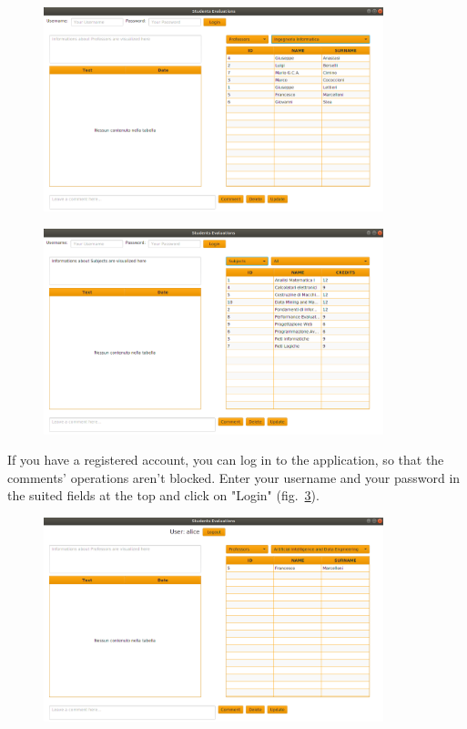 \documentclass[a4paper, oneside]{article}
\begin{document}
\begin{figure}[h]
\centering
\includegraphics[width=0.88\textwidth]{images/screens/screen1}
\label{fig:screen1}
\end{figure}
\clearpage
\begin{figure}[h]
\centering
\includegraphics[width=0.88\textwidth]{images/screens/screen2}
\label{fig:screen2}
\end{figure}

If you have a registered account, you can log in to the application, so that the comments' operations aren't blocked. Enter your username and your password in the suited fields at the top and click on "Login" (fig.~\ref{fig:screenLogin}).
\begin{figure}[h]
\centering
\includegraphics[width=0.88\textwidth]{images/screens/screenLogin}
\label{fig:screenLogin}
\end{figure}
\end{document}
